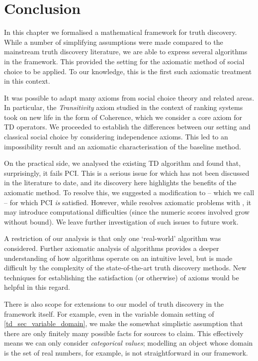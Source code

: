 \section{Conclusion}
\label{td_sec_conclusion}

In this chapter we formalised a mathematical framework for truth discovery. While
a number of simplifying assumptions were made compared to the mainstream truth
discovery literature, we are able to express several algorithms in the
framework. This provided the setting for the axiomatic method of social choice
to be applied. To our knowledge, this is the first such axiomatic treatment in
this context.

It was possible to adapt many axioms from social choice theory and related
areas. In particular, the \emph{Transitivity} axiom studied in the context of
ranking systems~\cite{tennenholtz2004,altman2008} took on new life in the form
of Coherence, which we consider a core axiom for TD operators.
We proceeded to establish the differences between our setting and classical
social choice by considering independence axioms. This led to an impossibility
result and an axiomatic characterisation of the baseline \voting{} method.

On the practical side, we analysed the existing TD algorithm \sums{} and found
that, surprisingly, it fails PCI. This is a serious issue for \sums{} which has
not been discussed in the literature to date, and its discovery here highlights
the benefits of the axiomatic method. To resolve this, we suggested a
modification to \sums{} -- which we call \usums{} -- for which PCI \emph{is}
satisfied. However, while \usums{} resolves axiomatic problems with \sums{}, it
may introduce computational difficulties (since the numeric scores involved
grow without bound). We leave further investigation of such issues to future
work.

A restriction of our analysis is that only one `real-world' algorithm was
considered. Further axiomatic analysis of algorithms provides a deeper
understanding of how algorithms operate on an intuitive level, but is made
difficult by the complexity of the state-of-the-art truth discovery methods.
New techniques for establishing the satisfaction (or otherwise) of axioms would
be helpful in this regard.

There is also scope for extensions to our model of truth discovery in the
framework itself. For example, even in the variable domain setting of
\cref{td_sec_variable_domain}, we make the somewhat simplistic assumption that
there are only finitely many possible facts for sources to claim. This
effectively means we can only consider \emph{categorical values}; modelling an
object whose domain is the set of real numbers, for example, is not
straightforward in our framework.

